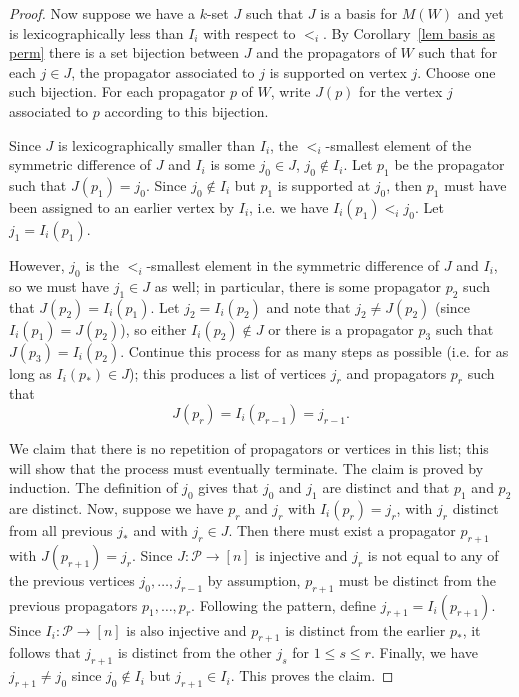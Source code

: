 \documentclass[11pt]{article}
\newcommand{\cP}{\mathcal{P}}
\theoremstyle{remark}
\theoremstyle{definition}
\begin{document}
\begin{proof}
Now suppose we have a $k$-set $J$ such that $J$ is a basis for $M(W)$ and yet is lexicographically less than $I_i$ with respect to $<_i$.  By Corollary~\ref{lem basis as perm} there is a set bijection between $J$ and the propagators of $W$ such that for each $j \in J$, the propagator associated to $j$ is supported on vertex $j$.  Choose one such bijection.  For each propagator $p$ of $W$, write $J(p)$ for the vertex $j$ associated to $p$ according to this bijection.

Since $J$ is lexicographically smaller than $I_i$, the $<_i$-smallest element of the symmetric difference of $J$ and $I_i$ is some $j_0\in J$, $j_0 \not\in I_i$. Let $p_1$ be the propagator such that $J(p_1)=j_0$.  Since $j_0\not\in I_i$ but $p_1$ is supported at $j_0$, then $p_1$ must have been assigned to an earlier vertex by $I_i$, i.e. we have $I_i(p_1) <_i j_0$.  Let $j_1 = I_i(p_1)$.

However, $j_0$ is the $<_i$-smallest element in the symmetric difference of $J$ and $I_i$, so we must have $j_1 \in J$ as well; in particular, there is some propagator $p_2$ such that $J(p_2)=I_i(p_1)$.  Let $j_2 = I_i(p_2)$ and note that $j_2 \neq J(p_2)$ (since $I_i(p_1)=J(p_2)$), so either $I_i(p_2) \not\in J$ or there is a propagator $p_3$ such that $J(p_3) = I_i(p_2)$. Continue this process for as many steps as possible (i.e. for as long as $I_i(p_*) \in J$); this produces a list of vertices $j_r$ and propagators $p_r$ such that 
\[J(p_r) = I_i(p_{r-1}) = j_{r-1}.\]

We claim that there is no repetition of propagators or vertices in this list; this will show that the process must eventually terminate. The claim is proved by induction.  The definition of $j_0$ gives that $j_0$ and $j_1$ are distinct and that $p_1$ and $p_2$ are distinct.  Now, suppose we have $p_r$ and $j_r$ with $I_i(p_r)=j_r$, with $j_r$ distinct from all previous $j_*$ and with $j_r\in J$.  Then there must exist a propagator $p_{r+1}$ with $J(p_{r+1}) = j_r$.  Since $J: \cP \longrightarrow [n]$ is injective and $j_r$ is not equal to any of the previous vertices $j_0, \dots, j_{r-1}$ by assumption, $p_{r+1}$ must be distinct from the previous propagators $p_1,\dots,p_r$.  Following the pattern, define $j_{r+1} = I_i(p_{r+1})$. Since $I_i: \cP \longrightarrow [n]$ is also injective and $p_{r+1}$ is distinct from the earlier $p_*$, it follows that $j_{r+1}$ is distinct from the other $j_s$ for $1\leq s\leq r$.  Finally, we have $j_{r+1}\neq j_0$ since $j_0\not\in I_i$ but $j_{r+1}\in I_i$.  This proves the claim.


\end{proof}
\end{document}
